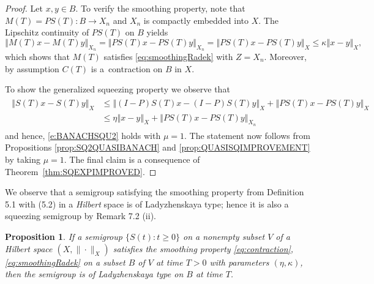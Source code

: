 \documentclass[a4paper,12pt,reqno]{amsart}
\theoremstyle{plain}
\newtheorem{prop}[lem]{Proposition}
\theoremstyle{definition}
\numberwithin{equation}{section}
\newcommand{\norm}[1]{\left\Vert#1\right\Vert}
\renewcommand{\geq}{\geqslant}
\renewcommand{\leq}{\leqslant}
\begin{document}
\begin{proof}
Let $x,y\in B$. To verify the smoothing property, note that $M(T)=PS(T)\colon B\to X_n$ and $X_n$ is compactly embedded into $X$. The Lipschitz continuity of $PS(T)$ on $B$ yields
$$\norm{M(T)x-M(T)y}_{X_n}=\norm{PS(T)x-PS(T)y}_{X_n}= \norm{PS(T)x-PS(T)y}_{X}\leq \kappa\norm{x-y}_{X},$$
which shows that $M(T)$ satisfies \eqref{eq:smoothingRadek} with $Z=X_n$. Moreover, by assumption $C(T)$ is a~contraction on $B$ in $X$.

To show the generalized squeezing property we observe that 
\begin{align}\label{eq:Lad_gen_squ}
\begin{split}
\norm{S(T)x-S(T)y}_{X}&\leq\norm{(I-P)S(T)x-(I-P)S(T)y}_{X}+\norm{PS(T)x-PS(T)y}_{X}\\
&\leq \eta\norm{x-y}_{X}+\norm{PS(T)x-PS(T)y}_{X_n}
\end{split}
\end{align}
and hence, %
\eqref{e:BANACHSQU2} holds with $\mu=1$.
The statement now follows from Propositions \ref{prop:SQ2QUASIBANACH} and \ref{prop:QUASISQIMPROVEMENT} by taking $\mu=1$. The final claim is a consequence of Theorem~\ref{thm:SQEXPIMPROVED}.
\end{proof}


We observe that a semigroup satisfying the smoothing property from Definition 5.1 with (5.2) in a \emph{Hilbert} space is of Ladyzhenskaya type; hence it is also a squeezing semigroup by Remark 7.2 (ii).  

\begin{prop}
If a semigroup $\{S(t)\colon t\geq 0\}$ on a nonempty subset $V$ of a Hilbert space $(X,\|\cdot\|_{X})$ satisfies the smoothing property 
\eqref{eq:contraction}, \eqref{eq:smoothingRadek} on a subset $B$ of $V$ at time $T>0$ with parameters $(\eta,\kappa)$, 
then the semigroup is of Ladyzhenskaya type on $B$ at time $T$.
\end{prop}
\end{document}
